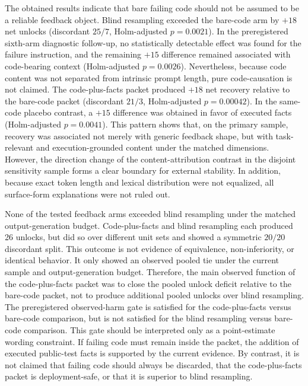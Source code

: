 \documentclass{article}
\numberwithin{equation}{section}  %
\theoremstyle{definition}
\begin{document}
The obtained results indicate that bare failing code should not be assumed to be a reliable
feedback object. Blind resampling exceeded the bare-code arm by $+18$ net unlocks
(discordant $25/7$, Holm-adjusted $p=0.0021$). In the preregistered sixth-arm diagnostic
follow-up, no statistically detectable effect was found for the failure instruction, and the
remaining $+15$ difference remained associated with code-bearing context
(Holm-adjusted $p=0.0026$). Nevertheless, because code content was not separated from
intrinsic prompt length, pure code-causation is not claimed. The code-plus-facts packet
produced $+18$ net recovery relative to the bare-code packet (discordant $21/3$,
Holm-adjusted $p=0.00042$). In the same-code placebo contrast, a $+15$ difference was
obtained in favor of executed facts (Holm-adjusted $p=0.0041$). This pattern shows that, on
the primary sample, recovery was associated not merely with generic feedback shape, but with
task-relevant and execution-grounded content under the matched dimensions. However, the
direction change of the content-attribution contrast in the disjoint sensitivity sample forms
a clear boundary for external stability. In addition, because exact token length and lexical
distribution were not equalized, all surface-form explanations were not ruled out.

None of the tested feedback arms exceeded blind resampling under the matched
output-generation budget. Code-plus-facts and blind resampling each produced 26 unlocks, but
did so over different unit sets and showed a symmetric $20/20$ discordant split. This
outcome is not evidence of equivalence, non-inferiority, or identical behavior. It only showed
an observed pooled tie under the current sample and output-generation budget. Therefore, the
main observed function of the code-plus-facts packet was to close the pooled unlock deficit
relative to the bare-code packet, not to produce additional pooled unlocks over blind
resampling. The preregistered observed-harm gate is satisfied for the code-plus-facts versus
bare-code comparison, but is not satisfied for the blind resampling versus bare-code
comparison. This gate should be interpreted only as a point-estimate wording constraint. If
failing code must remain inside the packet, the addition of executed public-test facts is
supported by the current evidence. By contrast, it is not claimed that failing code should
always be discarded, that the code-plus-facts packet is deployment-safe, or that it is superior
to blind resampling.
\end{document}
